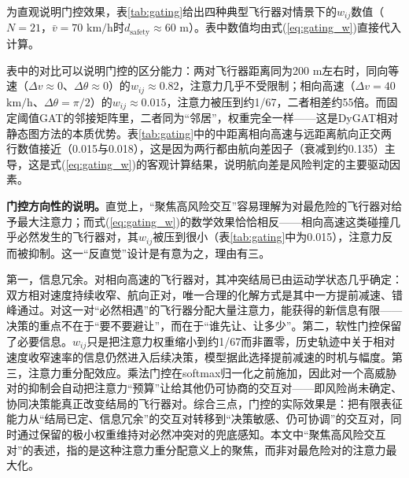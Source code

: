 \documentclass[12pt,a4paper,UTF8]{ctexart}
\begin{document}
为直观说明门控效果，表\ref{tab:gating}给出四种典型飞行器对情景下的$w_{ij}$数值（$N=21$，$\bar{v}=70$ $\mathrm{km/h}$时$d_{\text{safety}}\approx60$ m）。表中数值均由式(\ref{eq:gating_w})直接代入计算。

\begin{table}[H]
    \centering\small
    \caption{$w_{ij}$在不同飞行器对情景下的门控效果（按式(\ref{eq:gating_w})计算）}
    \label{tab:gating}
\end{table}

表中的对比可以说明门控的区分能力：两对飞行器距离同为200 m左右时，同向等速（$\Delta v\approx0$、$\Delta\theta\approx0$）的$w_{ij}\approx0.82$，注意力几乎不受限制；相向高速（$\Delta v=40$ $\mathrm{km/h}$、$\Delta\theta=\pi/2$）的$w_{ij}\approx0.015$，注意力被压到约1/67，二者相差约55倍。而固定阈值GAT的邻接矩阵里，二者同为“邻居”，权重完全一样——这是DyGAT相对静态图方法的本质优势。表\ref{tab:gating}中的中距离相向高速与远距离航向正交两行数值接近（0.015与0.018），这是因为两行都由航向差因子（衰减到约0.135）主导，这是式(\ref{eq:gating_w})的客观计算结果，说明航向差是风险判定的主要驱动因素。

\textbf{门控方向性的说明。}直觉上，“聚焦高风险交互”容易理解为对最危险的飞行器对给予最大注意力；而式(\ref{eq:gating_w})的数学效果恰恰相反——相向高速这类碰撞几乎必然发生的飞行器对，其$w_{ij}$被压到很小（表\ref{tab:gating}中为0.015），注意力反而被抑制。这一“反直觉”设计是有意为之，理由有三。

第一，信息冗余。对相向高速的飞行器对，其冲突结局已由运动学状态几乎确定：双方相对速度持续收窄、航向正对，唯一合理的化解方式是其中一方提前减速、错峰通过。对这一对“必然相遇”的飞行器分配大量注意力，能获得的新信息有限——决策的重点不在于“要不要避让”，而在于“谁先让、让多少”。第二，软性门控保留了必要信息。$w_{ij}$只是把注意力权重缩小到约1/67而非置零，历史轨迹中关于相对速度收窄速率的信息仍然进入后续决策，模型据此选择提前减速的时机与幅度。第三，注意力重分配效应。乘法门控在softmax归一化之前施加，因此对一个高威胁对的抑制会自动把注意力“预算”让给其他仍可协商的交互对——即风险尚未确定、协同决策能真正改变结局的飞行器对。综合三点，门控的实际效果是：把有限表征能力从“结局已定、信息冗余”的交互对转移到“决策敏感、仍可协调”的交互对，同时通过保留的极小权重维持对必然冲突对的兜底感知。本文中“聚焦高风险交互对”的表述，指的是这种注意力重分配意义上的聚焦，而非对最危险对的注意力最大化。
\end{document}

